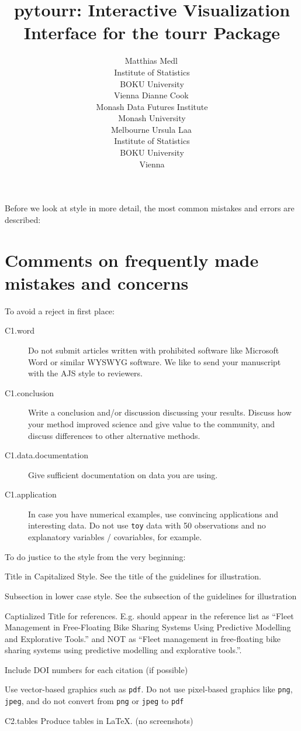 \documentclass[article]{ajs}
\author{Matthias Medl\,\orcidlink{0000-0002-3354-4579}\\ Institute of Statistics \\ BOKU University \\ Vienna \And 
        Dianne Cook\,\orcidlink{0000-0002-3813-7155}\\ Monash Data Futures Institute \\ Monash University \\ Melbourne \And
        Ursula Laa\,\orcidlink{0000-0002-0249-6439}\\ Institute of Statistics \\ BOKU University \\ Vienna}
\title{pytourr: Interactive Visualization Interface for the tourr Package}
\begin{document}

Before we look at style in more detail, the most common mistakes and errors are described:

\section{Comments on frequently made mistakes and concerns}

To avoid a reject in first place:

\begin{description}
\item[C1.word] Do not submit articles written with prohibited software like Microsoft Word or similar WYSWYG software. We like to send your manuscript with the AJS style to reviewers. 
\item[C1.conclusion] Write a conclusion and/or discussion discussing your results.  Discuss how your method improved science and give value to the community, and discuss differences to other alternative methods. 
\item[C1.data.documentation] Give sufficient documentation on data you are using.
\item[C1.application] In case you have numerical examples, use convincing applications and interesting data. Do not use \texttt{toy} data with 50 observations and no explanatory variables / covariables, for example. 
\end{description}

To do justice to the style from the very beginning:

\begin{description}
\item[C2.title] Title in Capitalized Style. See the title of the guidelines for illustration.
\item[C2.subsections]  Subsection in lower case style. See the subsection of the guidelines for illustration
\item[C2.references]  Captialized Title for references. E.g. \cite{fleet20} should appear in the reference list as ``Fleet Management in Free-Floating Bike Sharing Systems Using
  Predictive Modelling and Explorative Tools.'' and NOT as ``Fleet management in free-floating bike sharing systems using
  predictive modelling and explorative tools.''.
\item[C2.doi]  Include DOI numbers for each citation (if possible)
\item[C2.graphics]  Use vector-based graphics such as \texttt{pdf}. Do not use pixel-based graphics like \texttt{png}, \texttt{jpeg}, and do not convert from \texttt{png} or \texttt{jpeg} to \texttt{pdf}
\item{C2.tables} Produce tables in \LaTeX{}. (no screenshots)
\end{description}
\end{document}
